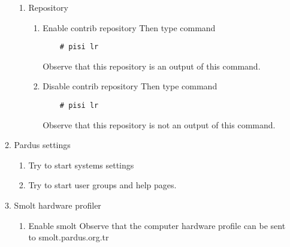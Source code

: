 \documentclass[a4paper,10pt]{article}
\begin{document}
\begin{enumerate}
\begin{enumerate}
        \begin{enumerate}
        \item Repository
            \begin{enumerate}
            \item Enable contrib repository 
                Then type command 
\begin{verbatim}
    # pisi lr 
\end{verbatim}
                 Observe that this repository is an output of this command.
            \item Disable contrib repository
                Then type command 
\begin{verbatim}
    # pisi lr 
\end{verbatim}
                 Observe that this repository is not an output of this command.
            \end{enumerate}
        \end{enumerate}

    \item Pardus settings
        \begin{enumerate}
        \item Try to start systems settings
        \item Try to start user groups and help pages.
        \end{enumerate}

    \item Smolt hardware profiler
        \begin{enumerate}
        \item Enable smolt 
            Observe that the computer hardware profile can be sent to smolt.pardus.org.tr
        \end{enumerate}
    \end{enumerate}
\end{enumerate}
\end{document}
